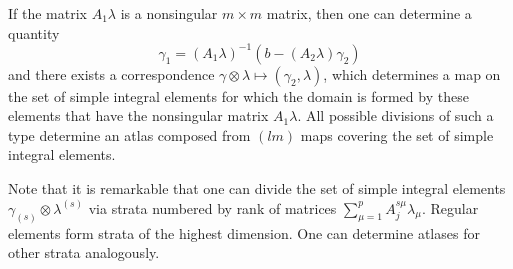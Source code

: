 \documentclass{birkjour}
\theoremstyle{definition}
\theoremstyle{remark}
\numberwithin{equation}{section}
\numberwithin{equation}{section}
\numberwithin{thm}{section}
\numberwithin{equation}{section}
\numberwithin{thm}{section}
\begin{document}
If the  matrix $A_1\lambda$ is a nonsingular $m\times m$ matrix, then one can determine a quantity
$$
\gamma_{1}=(A_1\lambda )^{-1}(b-(A_2\lambda )\gamma_2)
$$ 
and there exists a correspondence $\gamma\otimes \lambda\mapsto (\gamma_2,\lambda)$, which determines a map on the set of simple integral elements for which the domain is formed by these elements that have the nonsingular matrix $A_1\lambda$.
All possible divisions of such a type determine an atlas composed from $(l m)$ maps covering the set of simple integral elements.

Note that it is remarkable that one can divide the set of simple integral elements $\gamma_{(s)}\otimes \lambda^{(s)}$ via strata numbered by rank of matrices $\sum_{\mu=1}^pA^{s\mu}_j\lambda_{\mu}$. Regular elements form strata of the highest dimension. One can determine atlases for other strata analogously.
\end{document}
